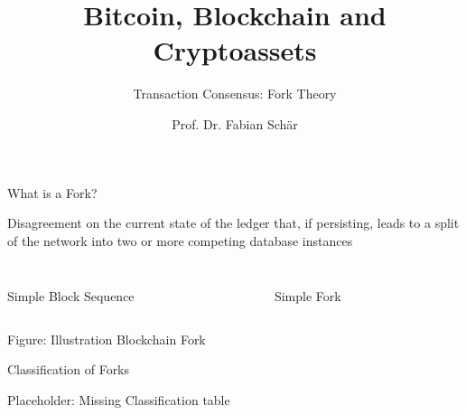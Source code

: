 \documentclass[handout]{beamer}
\title{Bitcoin, Blockchain and Cryptoassets}
\subtitle{Transaction Consensus: Fork Theory}
\author{Prof. Dr. Fabian Schär}
\institute{University of Basel}
\begin{document}
\thispagestyle{empty}
\begin{frame}[noframenumbering]
	\titlepage
\end{frame}


\begin{frame}{What is a Fork?}

\color{focus} Disagreement on the current state \color{black} of the ledger that, if persisting, leads to a \color{focus} split of the network \color{black}  into two or more competing database instances

\begin{columns}[T]
	\begin{column}{0.45\textwidth}
		\begin{figure}[h]
  			\center
  			\resizebox{0.9\textwidth}{!}{
			
			}
		\end{figure}
	\end{column}
	\begin{column}{0.45\textwidth}
		\begin{figure}[h]
  			\center
  			\resizebox{0.9\textwidth}{!}{
			
			}
		\end{figure}
	\end{column}
\end{columns}

\begin{columns}[T]
	\begin{column}{0.45\textwidth}
		\center		
		\footnotesize Simple Block Sequence
	\end{column}
	\begin{column}{0.45\textwidth}
		\center
 		\footnotesize Simple Fork 
	\end{column}
\end{columns}
\begin{center}
Figure: Illustration Blockchain Fork \cite{schar2020blockchain}
\end{center}


\end{frame}

\begin{frame}{Classification of Forks}

Placeholder: Missing Classification table 
	
\end{frame}
\end{document}
